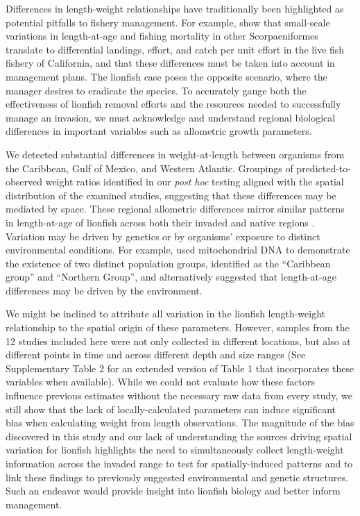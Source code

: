 \documentclass[fleqn,10pt,lineno]{wlpeerj} %
\begin{document}
Differences in length-weight relationships have traditionally been
highlighted as potential pitfalls to fishery management. For example,
\citet{wilson_2012} show that small-scale variations in length-at-age
and fishing mortality in other Scorpaeniformes translate to differential
landings, effort, and catch per unit effort in the live fish fishery of
California, and that these differences must be taken into account in
management plans. The lionfish case poses the opposite scenario, where
the manager desires to eradicate the species. To accurately gauge both
the effectiveness of lionfish removal efforts and the resources needed
to successfully manage an invasion, we must acknowledge and understand
regional biological differences in important variables such as
allometric growth parameters.

We detected substantial differences in weight-at-length between
organisms from the Caribbean, Gulf of Mexico, and Western Atlantic.
Groupings of predicted-to-observed weight ratios identified in our
\emph{post hoc} testing aligned with the spatial distribution of the
examined studies, suggesting that these differences may be mediated by
space. These regional allometric differences mirror similar patterns in
length-at-age of lionfish across both their invaded and native regions
\citep{pusack_2016}. Variation may be driven by genetics or by
organisms' exposure to distinct environmental conditions. For example,
\citet{betancurr_2011} used mitochondrial DNA to demonstrate the
existence of two distinct population groups, identified as the
``Caribbean group'' and ``Northern Group'', and \citet{fogg_2015}
alternatively suggested that length-at-age differences may be driven by
the environment.

We might be inclined to attribute all variation in the lionfish
length-weight relationship to the spatial origin of these parameters.
However, samples from the 12 studies included here were not only
collected in different locations, but also at different points in time
and across different depth and size ranges (See Supplementary Table 2
for an extended version of Table 1 that incorporates these variables
when available). While we could not evaluate how these factors influence
previous estimates without the necessary raw data from every study, we
still show that the lack of locally-calculated parameters can induce
significant bias when calculating weight from length observations. The
magnitude of the bias discovered in this study and our lack of
understanding the sources driving spatial variation for lionfish
highlights the need to simultaneously collect length-weight information
across the invaded range to test for spatially-induced patterns and to
link these findings to previously suggested environmental and genetic
structures. Such an endeavor would provide insight into lionfish biology
and better inform management.
\end{document}
